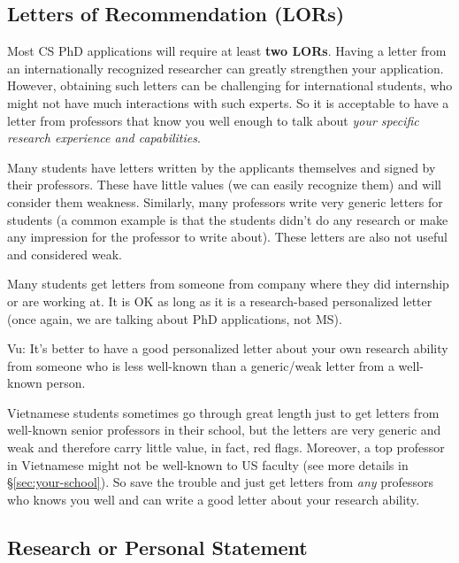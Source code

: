 \documentclass[11pt]{article}
\newenvironment{commentbox}{
 \small
    \begin{cbox}
 }{
   \end{cbox}
}
\begin{document}
\subsection{Letters of Recommendation (LORs)}

Most CS PhD applications will require at least \textbf{two LORs}. Having a letter from an internationally recognized researcher can greatly strengthen your application. However, obtaining such letters
can be challenging for international students, who might not have much interactions with such experts. So it is acceptable to have a letter from professors that know you well enough to talk about \emph{your specific research experience and capabilities}.


Many students have letters written by the applicants themselves and signed by their professors. These have little
values (we can easily recognize them) and will consider them weakness.
Similarly, many professors write very generic letters for students (a common example is that the students didn't do any
research or make any impression for the professor to write about). These
letters are also not useful and considered weak.

Many students get letters from someone from company where they did internship or are
working at. It is OK as long as it is a research-based personalized
letter (once again, we are talking about PhD applications, not MS).


\begin{commentbox}
Vu: It's better to have a good personalized
letter about your own research ability from someone who is less
well-known than a generic/weak letter from a well-known person.

Vietnamese students sometimes go through great length just to get letters from well-known senior professors in their school, but the letters are very generic and weak and therefore carry little value, in fact, red flags. Moreover, a top professor in Vietnamese might not be well-known to US faculty (see more details in \S\ref{sec:your-school}). So save the trouble and just get letters from \emph{any} professors who knows you well and can write a good letter about your research ability.
\end{commentbox}

\subsection{Research or Personal Statement}\label{sec:research-statement}
\end{document}
